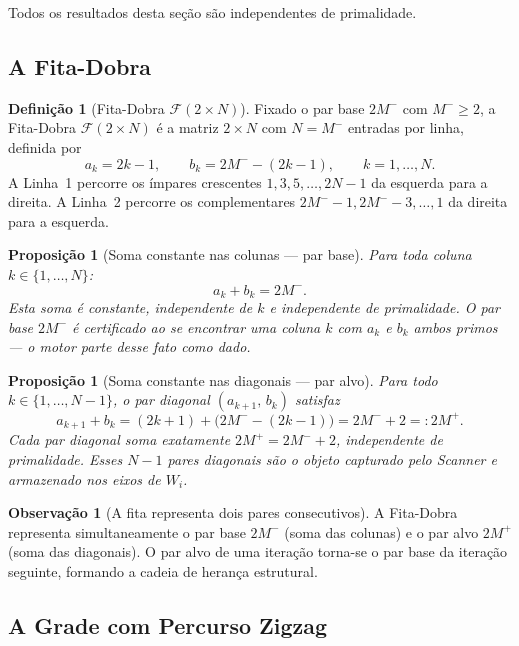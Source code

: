 \documentclass[12pt,a4paper]{article}
\newtheorem{proposition}[theorem]{Proposição}
\theoremstyle{definition}
\newtheorem{definition}[theorem]{Definição}
\newtheorem{remark}[theorem]{Observação}
\newcommand{\F}{\mathcal{F}}           %
\begin{document}
	Todos os resultados desta seção são independentes de primalidade.
	
	\subsection{A Fita-Dobra}
	
	\begin{definition}[Fita-Dobra $\F(2 \times N)$]
		\label{def:fita}
		Fixado o par base $2M^-$ com $M^- \geq 2$, a Fita-Dobra
		$\F(2 \times N)$ é a matriz $2 \times N$ com $N = M^-$ entradas por
		linha, definida por
		\[
		a_k = 2k - 1,\qquad b_k = 2M^- - (2k-1),\qquad k = 1,\ldots,N.
		\]
		A Linha~1 percorre os ímpares crescentes $1, 3, 5, \ldots, 2N-1$
		da esquerda para a direita. A Linha~2 percorre os complementares
		$2M^{-}-1, 2M^{-}-3, \ldots, 1$ da direita para a esquerda.
	\end{definition}
	
	\begin{proposition}[Soma constante nas colunas — par base]
		\label{prop:coluna}
		Para toda coluna $k \in \{1, \ldots, N\}$:
		\[
		a_k + b_k = 2M^-.
		\]
		Esta soma é constante, independente de $k$ e independente de
		primalidade. O par base $2M^-$ é certificado ao se encontrar uma
		coluna $k$ com $a_k$ e $b_k$ ambos primos — o motor parte desse
		fato como dado.
	\end{proposition}
	
	\begin{proposition}[Soma constante nas diagonais — par alvo]
		\label{prop:diagonal}
		Para todo $k \in \{1, \ldots, N-1\}$, o par diagonal
		$(a_{k+1},\, b_k)$ satisfaz
		\[
		a_{k+1} + b_k
		= (2k+1) + \bigl(2M^- - (2k-1)\bigr)
		= 2M^- + 2
		=: 2M^+.
		\]
		Cada par diagonal soma exatamente $2M^+ = 2M^- + 2$,
		independente de primalidade. Esses $N-1$ pares diagonais são o
		objeto capturado pelo Scanner e armazenado nos eixos de $W_i$.
	\end{proposition}
	
	\begin{remark}[A fita representa dois pares consecutivos]
		A Fita-Dobra representa simultaneamente o par base $2M^-$
		(soma das colunas) e o par alvo $2M^+$ (soma das diagonais).
		O par alvo de uma iteração torna-se o par base da iteração
		seguinte, formando a cadeia de herança estrutural.
	\end{remark}
	
	\subsection{A Grade com Percurso Zigzag}
	
\end{document}
